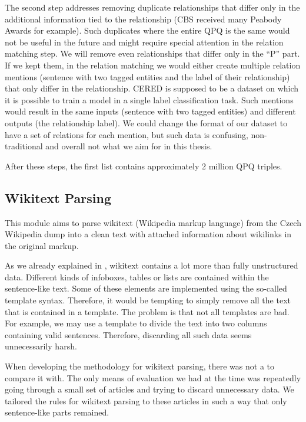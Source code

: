 The second step addresses removing duplicate relationships that differ only in the additional information tied to the relationship (CBS received many Peabody Awards for example). Such duplicates where the entire QPQ is the same would not be useful in the future and might require special attention in the relation matching step. We will remove even relationships that differ only in the “P” part. If we kept them, in the relation matching we would either create multiple relation mentions (sentence with two tagged entities and the label of their relationship) that only differ in the relationship. CERED is supposed to be a dataset on which it is possible to train a model in a single label classification task. Such mentions would result in the same inputs (sentence with two tagged entities) and different outputs (the relationship label). We could change the format of our dataset to have a set of relations for each mention, but such data is confusing, non-traditional and overall not what we aim for in this thesis. 

After these steps, the first list contains approximately 2 million QPQ triples.

\subsection{Wikitext Parsing}

\label{sec:wikiperia_parsing_implementation}

This module aims to parse wikitext (Wikipedia markup language) from the Czech Wikipedia dump into a clean text with attached information about wikilinks in the original markup.

As we already explained in , wikitext contains a lot more than fully unstructured data. Different kinds of infoboxes, tables or lists are contained within the sentence-like text. Some of these elements are implemented using the so-called template syntax. Therefore, it would be tempting to simply remove all the text that is contained in a template. The problem is that not all templates are bad. For example, we may use a template to divide the text into two columns containing valid sentences. Therefore, discarding all such data seems unnecessarily harsh.

When developing the methodology for wikitext parsing, there was not a  to compare it with. The only means of evaluation we had at the time was repeatedly going through a small set of articles and trying to discard unnecessary data. We tailored the rules for wikitext parsing to these articles in such a way that only sentence-like parts remained. 

